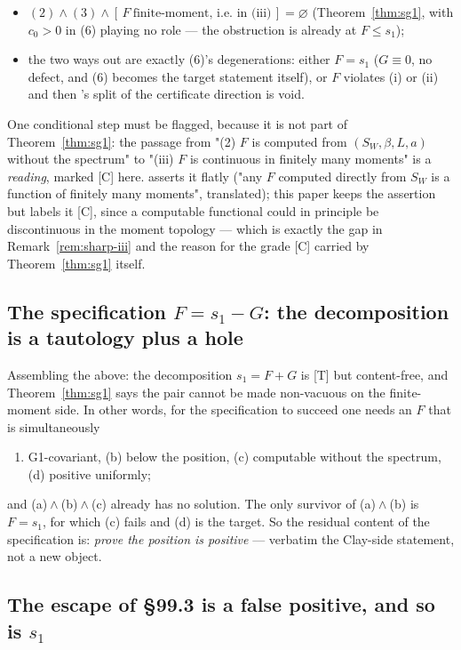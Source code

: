 \documentclass[11pt]{article}
\theoremstyle{definition}
\theoremstyle{remark}
\newcommand{\code}[1]{\texttt{\footnotesize\detokenize{#1}}}
\newcommand{\grT}{\textsf{[T]}}
\newcommand{\grC}{\textsf{[C]}}
\begin{document}
\begin{itemize}\itemsep2pt
\item $(2)\wedge(3)\wedge[\,F\ \text{finite-moment, i.e.\ in (iii)}\,]=\varnothing$
(Theorem~\ref{thm:sg1}, with $c_0>0$ in (6) playing no role --- the obstruction
is already at $F\le s_1$);
\item the two ways out are exactly (6)'s degenerations: either $F=s_1$
($G\equiv0$, no defect, and (6) becomes the target statement itself), or $F$
violates (i) or (ii) and then \code{NS2-0}'s split of the certificate
direction is void.
\end{itemize}

\noindent
One conditional step must be flagged, because it is not part of
Theorem~\ref{thm:sg1}: the passage from "(2) $F$ is computed from
$(S_W,\beta,L,a)$ without the spectrum" to "(iii) $F$ is continuous in finitely
many moments" is a \emph{reading}, marked \grC{} here. \code{SG1.md:132}
asserts it flatly ("any $F$ computed directly from $S_W$ is a function of
finitely many moments", translated); this paper keeps the assertion but labels
it \grC, since a computable functional could in principle be discontinuous in
the moment topology --- which is exactly the gap in
Remark~\ref{rem:sharp-iii} and the reason for the grade \grC{} carried by
Theorem~\ref{thm:sg1} itself.

\subsection[The specification]{The specification $F=s_1-G$: the decomposition is a tautology plus
a hole}

Assembling the above: the decomposition $s_1=F+G$ is \grT{} but content-free,
and Theorem~\ref{thm:sg1} says the pair cannot be made non-vacuous on the
finite-moment side. In other words, for the specification to succeed one needs
an $F$ that is simultaneously
\begin{enumerate}\itemsep1pt
\item[(a)] G1-covariant, (b) below the position, (c) computable without the
spectrum, (d) positive uniformly;
\end{enumerate}
and (a)${}\wedge{}$(b)${}\wedge{}$(c) already has no solution. The only survivor
of (a)${}\wedge{}$(b) is $F=s_1$, for which (c) fails and (d) is the target.
So the residual content of the specification is: \emph{prove the position is
positive} --- verbatim the Clay-side statement, not a new object.

\subsection[SG2]{The escape of \S99.3 is a false positive, and so is $s_1$}
\end{document}
